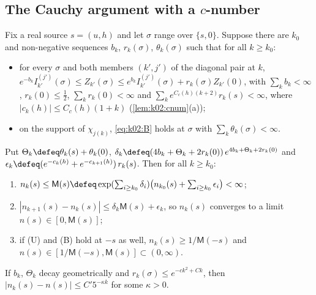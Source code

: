 \subsection{The Cauchy argument with a $c$-number}\label{ssec:k02:CAh}

\begin{theorem}\label{thm:k02:CAh}
Fix a real source $s=(u,h)$ and let $\sigma$ range over $\{s,0\}$. Suppose there are $k_0$ and non-negative sequences $b_k$, $r_k(\sigma)$, $\theta_k(\sigma)$ such that for all $k\ge k_0$:
\begin{itemize}[leftmargin=2em]
\item[\textup{(U)}] for every $\sigma$ and both members $(k',j')$ of the diagonal pair at $k$,
$e^{-b_k}I^{(j')}_{k'}(\sigma)\le Z_{k'}(\sigma)\le e^{b_k}I^{(j')}_{k'}(\sigma)+r_k(\sigma)Z_{k'}(0)$, with $\sum_kb_k<\infty$, $r_k(0)\le\frac12$, $\sum_kr_k(0)<\infty$ and $\sum_ke^{C_c(h)(k+2)}r_k(s)<\infty$, where $|c_k(h)|\le C_c(h)(1+k)$ (\cref{lem:k02:cnum}\textup{(a)});
\item[\textup{(B)}] on the support of $\chi_{j(k)}$, \eqref{eq:k02:B} holds at $\sigma$ with $\sum_k\theta_k(\sigma)<\infty$.
\end{itemize}
Put $\Theta_k\defeq\theta_k(s)+\theta_k(0)$, $\delta_k\defeq(4b_k+\Theta_k+2r_k(0))\,e^{4b_k+\Theta_k+2r_k(0)}$ and $\epsilon_k\defeq(e^{-c_k(h)}+e^{-c_{k+1}(h)})\,r_k(s)$. Then for all $k\ge k_0$:
\begin{enumerate}[label=\textup{(\roman*)},leftmargin=*]
\item $n_k(s)\le\mathsf M(s)\defeq\exp(\sum_{i\ge k_0}\delta_i)\big(n_{k_0}(s)+\sum_{i\ge k_0}\epsilon_i\big)<\infty$;
\item $|n_{k+1}(s)-n_k(s)|\le\delta_k\mathsf M(s)+\epsilon_k$, so $n_k(s)$ converges to a limit $n(s)\in[0,\mathsf M(s)]$;
\item if \textup{(U)} and \textup{(B)} hold at $-s$ as well, $n_k(s)\ge1/\mathsf M(-s)$ and $n(s)\in[1/\mathsf M(-s),\mathsf M(s)]\subset(0,\infty)$.
\end{enumerate}
If $b_k$, $\Theta_k$ decay geometrically and $r_k(\sigma)\le e^{-ck^2+Ck}$, then $|n_k(s)-n(s)|\le C'5^{-\kappa k}$ for some $\kappa>0$.
\end{theorem}

